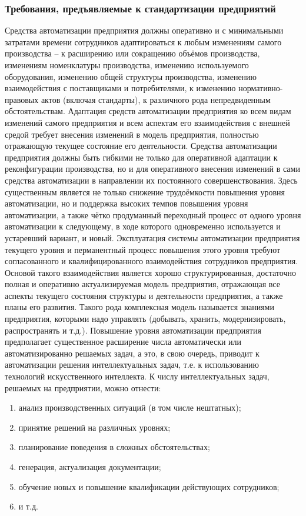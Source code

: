 \subsubsection{Требования, предъявляемые к стандартизации предприятий}

Средства автоматизации предприятия должны оперативно и с минимальными затратами времени сотрудников адаптироваться к любым изменениям самого производства – к расширению или сокращению объёмов производства, изменениям номенклатуры производства, изменению используемого оборудования, изменению общей структуры производства, изменению взаимодействия с поставщиками и потребителями, к изменению нормативно-правовых актов (включая стандарты), к различного рода непредвиденным обстоятельствам.
Адаптация средств автоматизации предприятия ко всем видам изменений самого предприятия и всем аспектам его взаимодействия с внешней средой требует внесения изменений в модель предприятия, полностью отражающую текущее состояние его деятельности.
Средства автоматизации предприятия должны быть гибкими не только для оперативной адаптации к реконфигурации производства, но и для оперативного внесения изменений в сами средства автоматизации в направлении их постоянного совершенствования. Здесь существенным является не только снижение трудоёмкости повышения уровня автоматизации, но и поддержка высоких темпов повышения уровня автоматизации, а также чётко продуманный переходный процесс от одного уровня автоматизации к следующему, в ходе которого одновременно используется и устаревший вариант, и новый.
Эксплуатация системы автоматизации предприятия текущего уровня и перманентный процесс повышения этого уровня требуют согласованного и квалифицированного взаимодействия сотрудников предприятия. Основой такого взаимодействия является хорошо структурированная, достаточно полная и оперативно актуализируемая модель предприятия, отражающая все аспекты текущего состояния структуры и деятельности предприятия, а также планы его развития. Такого рода комплексная модель называется знаниями предприятия, которыми надо управлять (добывать, хранить, модернизировать, распространять и т.д.).
Повышение уровня автоматизации предприятия предполагает существенное расширение числа автоматически или автоматизированно решаемых задач, а это, в свою очередь, приводит к автоматизации решения интеллектуальных задач, т.е. к использованию технологий искусственного интеллекта. К числу интеллектуальных задач, решаемых на предприятии, можно отнести:
\begin{enumerate}
    \item анализ производственных ситуаций (в том числе нештатных);
    \item принятие решений на различных уровнях;
    \item планирование поведения в сложных обстоятельствах;
    \item генерация, актуализация документации;
    \item обучение новых и повышение квалификации действующих сотрудников;
    \item и т.д.
\end{enumerate}
